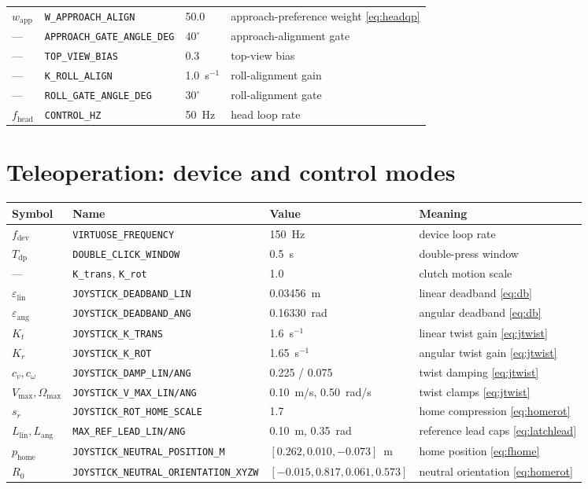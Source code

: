 \documentclass[12pt,a4paper,twoside,openright]{report}
\begin{document}
\begin{tabularx}{\linewidth}{@{}lllX@{}}
$w_{\text{app}}$ & \texttt{W\_APPROACH\_ALIGN} & 50.0 & approach-preference weight \eqref{eq:headqp} \\
--- & \texttt{APPROACH\_GATE\_ANGLE\_DEG} & $40^{\circ}$ & approach-alignment gate \\
--- & \texttt{TOP\_VIEW\_BIAS} & 0.3 & top-view bias \\
--- & \texttt{K\_ROLL\_ALIGN} & 1.0~s$^{-1}$ & roll-alignment gain \\
--- & \texttt{ROLL\_GATE\_ANGLE\_DEG} & $30^{\circ}$ & roll-alignment gate \\
$f_{\text{head}}$ & \texttt{CONTROL\_HZ} & 50~Hz & head loop rate \\
\bottomrule
\end{tabularx}

\section{Teleoperation: device and control modes}
\begin{tabularx}{\linewidth}{@{}l>{\raggedright\arraybackslash}p{4.3cm}lX@{}}
\toprule
Symbol & Name & Value & Meaning \\
\midrule
$f_{\text{dev}}$ & \texttt{VIRTUOSE\_FREQUENCY} & 150~Hz & device loop rate \\
$T_{\text{dp}}$ & \texttt{DOUBLE\_CLICK\_WINDOW} & 0.5~s & double-press window \\
--- & \texttt{K\_trans}, \texttt{K\_rot} & 1.0 & clutch motion scale \\
$\varepsilon_{\text{lin}}$ & \texttt{JOYSTICK\_DEADBAND\_LIN} & 0.03456~m & linear deadband \eqref{eq:db} \\
$\varepsilon_{\text{ang}}$ & \texttt{JOYSTICK\_DEADBAND\_ANG} & 0.16330~rad & angular deadband \eqref{eq:db} \\
$K_t$ & \texttt{JOYSTICK\_K\_TRANS} & 1.6~s$^{-1}$ & linear twist gain \eqref{eq:jtwist} \\
$K_r$ & \texttt{JOYSTICK\_K\_ROT} & 1.65~s$^{-1}$ & angular twist gain \eqref{eq:jtwist} \\
$c_v, c_\omega$ & \texttt{JOYSTICK\_DAMP\_LIN/ANG} & 0.225 / 0.075 & twist damping \eqref{eq:jtwist} \\
$V_{\max}, \Omega_{\max}$ & \texttt{JOYSTICK\_V\_MAX\_LIN/ANG} & 0.10~m/s, 0.50~rad/s & twist clamps \eqref{eq:jtwist} \\
$s_r$ & \texttt{JOYSTICK\_ROT\_HOME\_SCALE} & 1.7 & home compression \eqref{eq:homerot} \\
$L_{\text{lin}}, L_{\text{ang}}$ & \texttt{MAX\_REF\_LEAD\_LIN/ANG} & 0.10~m, 0.35~rad & reference lead caps \eqref{eq:latchlead} \\
$p_{\text{home}}$ & \texttt{JOYSTICK\_NEUTRAL\_\allowbreak POSITION\_M} & $[0.262, 0.010, -0.073]$~m & home position \eqref{eq:fhome} \\
$R_0$ & \texttt{JOYSTICK\_NEUTRAL\_\allowbreak ORIENTATION\_XYZW} & $[-0.015, 0.817, 0.061, 0.573]$ & neutral orientation \eqref{eq:homerot} \\
\bottomrule
\end{tabularx}
\end{document}
